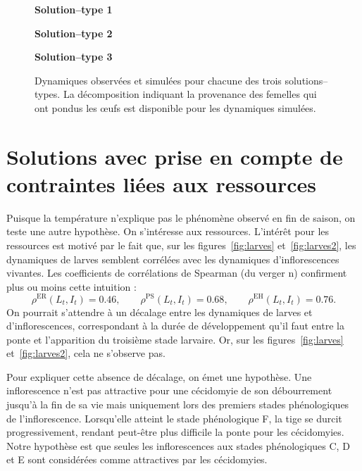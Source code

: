 \begin{figure}[h]
 \centering
 \textbf{Solution--type 1}
 
 
 \textbf{Solution--type 2}
 
 
 \textbf{Solution--type 3}
 
 \caption{Dynamiques observées et simulées pour chacune des trois solutions--types. La décomposition indiquant la provenance des femelles qui ont pondus les œufs est disponible pour les dynamiques simulées.}
 \label{fig:B}
\end{figure}

\clearpage
\section{Solutions avec prise en compte de contraintes liées aux ressources}

Puisque la température n'explique pas le phénomène observé en fin de saison, on teste une autre hypothèse.
On s'intéresse aux ressources.
L'intérêt pour les ressources est motivé par le fait que, sur les figures~\ref{fig:larves} et~\ref{fig:larves2}, les dynamiques de larves semblent corrélées avec les dynamiques d'inflorescences vivantes.
Les coefficients de corrélations de Spearman (du verger n) confirment plus ou moins cette intuition :
\[
\rho^{\text{ER}}\left( L_t, I_t  \right) =0.46,  \qquad \rho^{\text{PS}}\left( L_t, I_t  \right) =0.68, \qquad \rho^{\text{EH}}\left( L_t, I_t  \right) =0.76.
\]
On pourrait s'attendre à un décalage entre les dynamiques de larves et d'inflorescences, correspondant à la durée de développement qu'il faut entre la ponte et l'apparition du troisième stade larvaire.
Or, sur les figures~\ref{fig:larves} et~\ref{fig:larves2}, cela ne s'observe pas.

Pour expliquer cette absence de décalage, on émet une hypothèse.
Une inflorescence n'est pas attractive pour une cécidomyie de son débourrement jusqu'à la fin de sa vie mais uniquement lors des premiers stades phénologiques de l'inflorescence.
Lorsqu'elle atteint le stade phénologique F, la tige se durcit progressivement, rendant peut-être plus difficile la ponte pour les cécidomyies.
Notre hypothèse est que seules les inflorescences aux stades phénologiques C, D et E sont considérées comme attractives par les cécidomyies.

